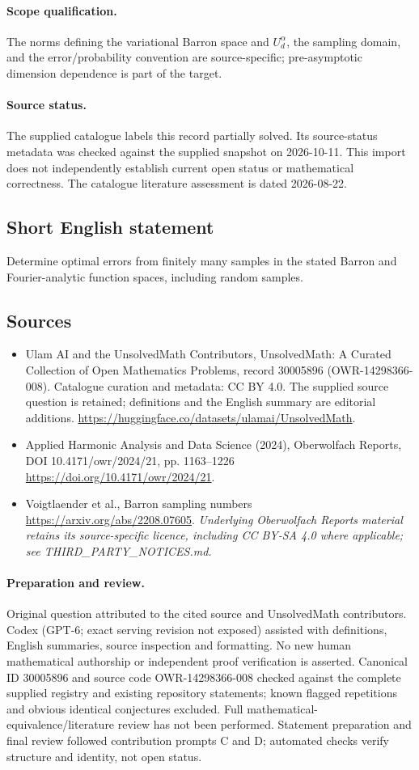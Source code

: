 \documentclass[11pt]{article}
\begin{document}
\paragraph{Scope qualification.}
The norms defining the variational Barron space and $U_d^\alpha$, the sampling domain, and the error/probability convention are source-specific; pre-asymptotic dimension dependence is part of the target.
\paragraph{Source status.}
The supplied catalogue labels this record partially solved. Its source-status metadata was checked against the supplied snapshot on 2026-10-11. This import does not independently establish current open status or mathematical correctness. The catalogue literature assessment is dated 2026-08-22.
\subsection{Short English statement}
Determine optimal errors from finitely many samples in the stated Barron and Fourier-analytic function spaces, including random samples.
\subsection{Sources}
\begin{itemize}
\item[S1] Ulam AI and the UnsolvedMath Contributors, UnsolvedMath: A Curated Collection of Open Mathematics Problems, record 30005896 (OWR-14298366-008). Catalogue curation and metadata: CC BY 4.0. The supplied source question is retained; definitions and the English summary are editorial additions.
\url{https://huggingface.co/datasets/ulamai/UnsolvedMath}.
\item[S2] Applied Harmonic Analysis and Data Science (2024), Oberwolfach Reports, DOI 10.4171/owr/2024/21, pp. 1163--1226
\url{https://doi.org/10.4171/owr/2024/21}.
\item[S3] Voigtlaender et al., Barron sampling numbers
\url{https://arxiv.org/abs/2208.07605}.
\textit{Underlying Oberwolfach Reports material retains its source-specific licence, including CC BY-SA 4.0 where applicable; see THIRD\_PARTY\_NOTICES.md.}
\end{itemize}
\paragraph{Preparation and review.}
Original question attributed to the cited source and UnsolvedMath contributors. Codex (GPT-6; exact serving revision not exposed) assisted with definitions, English summaries, source inspection and formatting. No new human mathematical authorship or independent proof verification is asserted. Canonical ID 30005896 and source code OWR-14298366-008 checked against the complete supplied registry and existing repository statements; known flagged repetitions and obvious identical conjectures excluded. Full mathematical-equivalence/literature review has not been performed. Statement preparation and final review followed contribution prompts C and D; automated checks verify structure and identity, not open status.
\label{end:30005896}
\end{document}
